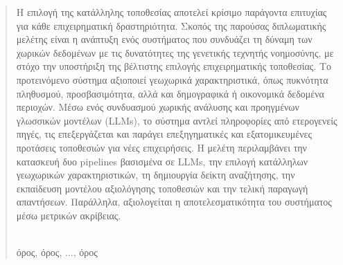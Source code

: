 
\begin{abstract}

Η επιλογή της κατάλληλης τοποθεσίας αποτελεί κρίσιμο παράγοντα επιτυχίας για κάθε επιχειρηματική δραστηριότητα. Σκοπός της παρούσας διπλωματικής μελέτης είναι η ανάπτυξη ενός συστήματος που συνδυάζει τη δύναμη των χωρικών δεδομένων με τις δυνατότητες της γενετικής τεχνητής νοημοσύνης, με στόχο την υποστήριξη της βέλτιστης επιλογής επιχειρηματικής τοποθεσίας. Το προτεινόμενο σύστημα αξιοποιεί γεωχωρικά χαρακτηριστικά, όπως πυκνότητα πληθυσμού, προσβασιμότητα, αλλά και δημογραφικά ή οικονομικά δεδομένα περιοχών. Μέσω ενός συνδυασμού χωρικής ανάλυσης και προηγμένων γλωσσικών μοντέλων (LLMs), το σύστημα αντλεί πληροφορίες από ετερογενείς πηγές, τις επεξεργάζεται και παράγει επεξηγηματικές και εξατομικευμένες προτάσεις τοποθεσιών για νέες επιχειρήσεις. Η μελέτη περιλαμβάνει την κατασκευή δυο pipelines βασισμένα σε LLMs, την επιλογή κατάλληλων γεωχωρικών χαρακτηριστικών, τη δημιουργία δείκτη αναζήτησης, την εκπαίδευση μοντέλου αξιολόγησης τοποθεσιών και την τελική παραγωγή απαντήσεων. Παράλληλα, αξιολογείται η αποτελεσματικότητα του συστήματος μέσω μετρικών ακρίβειας.

\vspace*{\fill}
\\ 
όρος, όρος, $\dots$, όρος
\end{abstract}







